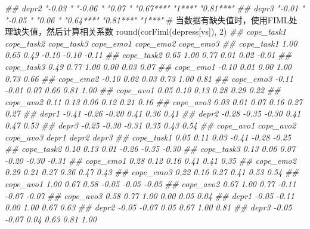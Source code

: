 \documentclass[
  chinese-hans,
  letterpaper,
  DIV=11,
  numbers=noendperiod]{scrartcl}
\newenvironment{Shaded}{\begin{snugshade}}{\end{snugshade}}
\newcommand{\CommentTok}[1]{\textcolor[rgb]{0.37,0.37,0.37}{#1}}
\newcommand{\DecValTok}[1]{\textcolor[rgb]{0.68,0.00,0.00}{#1}}
\newcommand{\DocumentationTok}[1]{\textcolor[rgb]{0.37,0.37,0.37}{\textit{#1}}}
\newcommand{\FunctionTok}[1]{\textcolor[rgb]{0.28,0.35,0.67}{#1}}
\newcommand{\NormalTok}[1]{\textcolor[rgb]{0.00,0.23,0.31}{#1}}
\begin{document}
\begin{Shaded}
\begin{Highlighting}[numbers=left,,]
\DocumentationTok{\#\# depr2      "{-}0.03 "  "{-}0.06 "  "0.07 "   "0.67***"  "1***"     "0.81***"}
\DocumentationTok{\#\# depr3      "{-}0.01 "  "{-}0.05 "  "0.06 "   "0.64***"  "0.81***"  "1***"}
\CommentTok{\# 当数据有缺失值时，使用FIML处理缺失值，然后计算相关系数}
\FunctionTok{round}\NormalTok{(}\FunctionTok{corFiml}\NormalTok{(depress[vs]), }\DecValTok{2}\NormalTok{)}
\DocumentationTok{\#\#            cope\_task1 cope\_task2 cope\_task3 cope\_emo1 cope\_emo2 cope\_emo3}
\DocumentationTok{\#\# cope\_task1       1.00       0.65       0.49     {-}0.10     {-}0.10     {-}0.11}
\DocumentationTok{\#\# cope\_task2       0.65       1.00       0.77      0.01      0.02     {-}0.01}
\DocumentationTok{\#\# cope\_task3       0.49       0.77       1.00      0.00      0.03      0.07}
\DocumentationTok{\#\# cope\_emo1       {-}0.10       0.01       0.00      1.00      0.73      0.66}
\DocumentationTok{\#\# cope\_emo2       {-}0.10       0.02       0.03      0.73      1.00      0.81}
\DocumentationTok{\#\# cope\_emo3       {-}0.11      {-}0.01       0.07      0.66      0.81      1.00}
\DocumentationTok{\#\# cope\_avo1        0.05       0.10       0.13      0.28      0.29      0.22}
\DocumentationTok{\#\# cope\_avo2        0.11       0.13       0.06      0.12      0.21      0.16}
\DocumentationTok{\#\# cope\_avo3        0.03       0.01       0.07      0.16      0.27      0.27}
\DocumentationTok{\#\# depr1           {-}0.41      {-}0.26      {-}0.20      0.41      0.36      0.41}
\DocumentationTok{\#\# depr2           {-}0.28      {-}0.35      {-}0.30      0.41      0.47      0.53}
\DocumentationTok{\#\# depr3           {-}0.25      {-}0.30      {-}0.31      0.35      0.43      0.54}
\DocumentationTok{\#\#            cope\_avo1 cope\_avo2 cope\_avo3 depr1 depr2 depr3}
\DocumentationTok{\#\# cope\_task1      0.05      0.11      0.03 {-}0.41 {-}0.28 {-}0.25}
\DocumentationTok{\#\# cope\_task2      0.10      0.13      0.01 {-}0.26 {-}0.35 {-}0.30}
\DocumentationTok{\#\# cope\_task3      0.13      0.06      0.07 {-}0.20 {-}0.30 {-}0.31}
\DocumentationTok{\#\# cope\_emo1       0.28      0.12      0.16  0.41  0.41  0.35}
\DocumentationTok{\#\# cope\_emo2       0.29      0.21      0.27  0.36  0.47  0.43}
\DocumentationTok{\#\# cope\_emo3       0.22      0.16      0.27  0.41  0.53  0.54}
\DocumentationTok{\#\# cope\_avo1       1.00      0.67      0.58 {-}0.05 {-}0.05 {-}0.05}
\DocumentationTok{\#\# cope\_avo2       0.67      1.00      0.77 {-}0.11 {-}0.07 {-}0.07}
\DocumentationTok{\#\# cope\_avo3       0.58      0.77      1.00  0.00  0.05  0.04}
\DocumentationTok{\#\# depr1          {-}0.05     {-}0.11      0.00  1.00  0.67  0.63}
\DocumentationTok{\#\# depr2          {-}0.05     {-}0.07      0.05  0.67  1.00  0.81}
\DocumentationTok{\#\# depr3          {-}0.05     {-}0.07      0.04  0.63  0.81  1.00}
\end{Highlighting}
\end{Shaded}
\end{document}
